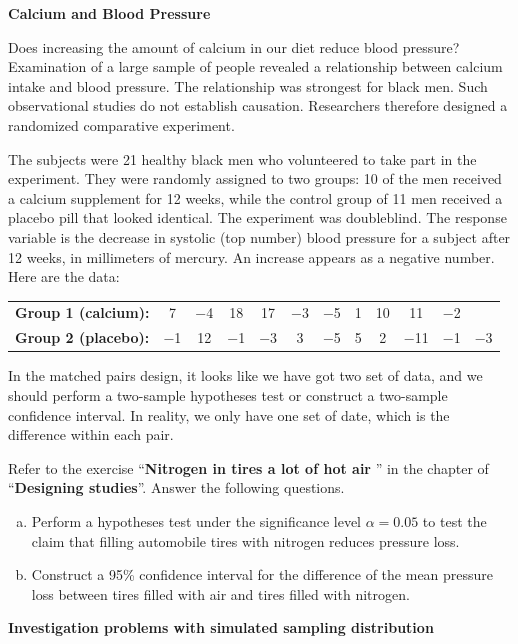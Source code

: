 \documentclass[a4paper, 12pt,twoside]{book}
\begin{document}
\newpage
 \colorbox{champagne}{\parbox{\textwidth}{
 \textbf{Calcium and Blood Pressure}\vspace{0.3cm}
 
 Does increasing the amount of calcium in our diet reduce blood pressure? Examination of a large sample of people revealed a relationship between calcium intake and blood pressure. The relationship was strongest for black men. Such observational studies do not establish causation. Researchers therefore designed a randomized comparative experiment.\vspace{0.3cm}
 
 The subjects were 21 healthy black men who volunteered to take part in the experiment. They were randomly assigned to two groups: 10 of the men received a calcium supplement for 12 weeks, while the control group of 11 men received a placebo pill that looked identical. The experiment was doubleblind. The response variable is the decrease in systolic (top number) blood pressure for a subject after 12 weeks, in millimeters of mercury. An increase appears as a negative number. Here are the data:
 \begin{table}[H]
 \centering
 \begin{tabular}{lcccc ccccc cc}
 \hline
 \textbf{Group 1 (calcium):}&7 &−4 &18 &17 &−3& −5 &1 &10 & 11& −2&\\
 \textbf{Group 2 (placebo):}&−1 &12 &−1 &−3 & 3 &−5& 5  &2& −11& −1 &−3\\
 \hline
 \end{tabular}
 \end{table} 
 }}
\newpage
\colorbox{babypink}{\parbox{\textwidth}{
In the matched pairs design, it looks like we have got two set of data, and we should perform a two-sample hypotheses test or construct a two-sample confidence interval. In reality, we only have one set of date, which is the difference within each pair.
}}
\vspace{0.3cm}

\colorbox{champagne}{\parbox{\textwidth}{
Refer to the exercise ``\textbf{Nitrogen in tires \textemdash a lot of hot air} '' in the chapter of ``\textbf{Designing studies}''. Answer the following questions.
   \begin{enumerate}[(a)]
      \item Perform a hypotheses test under the significance level $\alpha = 0.05$ to test the claim that filling automobile tires with nitrogen reduces pressure loss.
      \item Construct a 95\% confidence interval for the  difference of the mean pressure loss between tires filled with air and tires filled with nitrogen.
   \end{enumerate}
}}
\newpage
\textbf{Investigation problems with simulated sampling distribution}\vspace{0.6cm}
\end{document}
